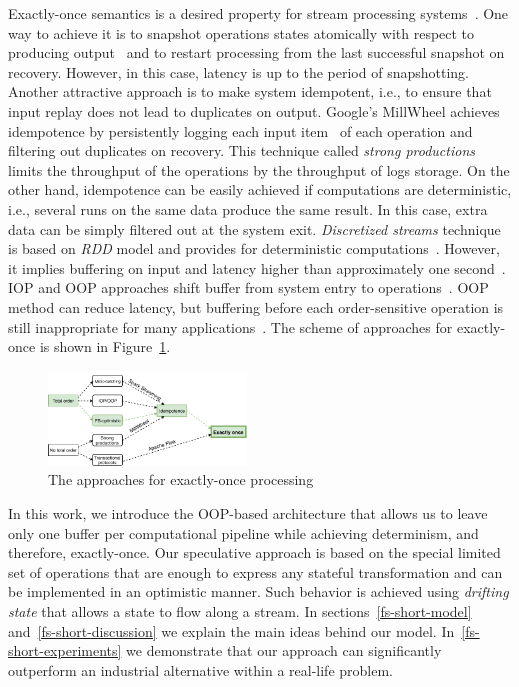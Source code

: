 \label {fs-short-intro}

Exactly-once semantics is a desired property for stream processing systems~\cite{Akidau:2013:MFS:2536222.2536229}. One way to achieve it is to snapshot operations states atomically with respect to producing output~\cite{Carbone:2017:SMA:3137765.3137777} and to restart processing from the last successful snapshot on recovery. However, in this case, latency is up to the period of snapshotting. Another attractive approach is to make system idempotent, i.e., to ensure that input replay does not lead to duplicates on output. Google's MillWheel achieves idempotence by persistently logging each input item~\cite{Akidau:2013:MFS:2536222.2536229} of each operation and filtering out duplicates on recovery. This technique called {\em strong productions} limits the throughput of the operations by the throughput of logs storage. On the other hand, idempotence can be easily achieved if computations are deterministic, i.e., several runs on the same data produce the same result. In this case, extra data can be simply filtered out at the system exit. {\em Discretized streams} technique is based on {\em RDD} model and provides for deterministic computations~\cite{Zaharia:2012:DSE:2342763.2342773}. However, it implies buffering on input and latency higher than approximately one second~\cite{Qian:2013:TRS:2465351.2465353}. IOP and OOP approaches shift buffer from system entry to operations~\cite{Li:2008:OPN:1453856.1453890}. OOP method can reduce latency, but buffering before each order-sensitive operation is still inappropriate for many applications~\cite{Zacheilas:2017:MDS:3093742.3093921}. The scheme of approaches for exactly-once is shown in Figure~\ref{approaches}.

\begin{figure}[ht]
  \centering
  \includegraphics[width=0.47\textwidth]{pics/intro-approaches}
  \caption{The approaches for exactly-once processing}
  \label {approaches}
\end{figure}

In this work, we introduce the OOP-based architecture that allows us to leave only one buffer per computational pipeline while achieving determinism, and therefore, exactly-once. Our speculative approach is based on the special limited set of operations that are enough to express any stateful transformation and can be implemented in an optimistic manner. Such behavior is achieved using {\em drifting state} that allows a state to flow along a stream. In sections~\ref{fs-short-model} and~\ref{fs-short-discussion} we explain the main ideas behind our model. In~\ref{fs-short-experiments} we demonstrate that our approach can significantly outperform an industrial alternative within a real-life problem. 